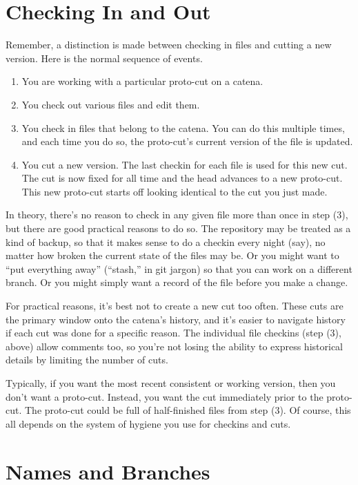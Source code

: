 \documentclass[10pt]{article}
\begin{document}
\section{Checking In and Out}

Remember, a distinction is made between checking in files and cutting
a new version. Here is the normal sequence of events. 
\begin{enumerate}
\item You are working with a particular proto-cut on a catena.
\item You check out various files and edit them.
\item You check in files that belong to the catena. You can do this
  multiple times, and each time you do so, the proto-cut's current
  version of the file is updated.
\item You cut a new version. The last checkin for each file is used for
    this new cut. The cut is now fixed for all time and the head advances
    to a new proto-cut. This new proto-cut starts off looking identical to 
    the cut you just made.
\end{enumerate}
In theory, there's no reason to check in any given file more than 
once in step (3), but there are good practical reasons to do so. The 
repository may be treated as a kind of backup, so that it makes sense to do
a checkin every night (say), no matter how broken the current state of the
files may be. Or you might want to ``put everything away'' (``stash,'' in git
jargon) so that you can work on a different branch. Or you might simply 
want a record of the file before you make a change.

For practical reasons, it's best not to create a new cut too often. These 
cuts are the primary window onto the catena's history, and it's easier to
navigate history if each cut was done for a specific reason. The individual
file checkins (step (3), above) allow comments too, so you're not
losing the ability to express historical details by limiting the
number of cuts. 

Typically, if you want the most recent consistent or working
version, then you don't want a proto-cut. Instead, you want the cut
immediately prior to the proto-cut. The proto-cut could be full of
half-finished files from step (3). Of course, this all depends on the
system of hygiene you use for checkins and cuts.

\section{Names and Branches}
\end{document}
